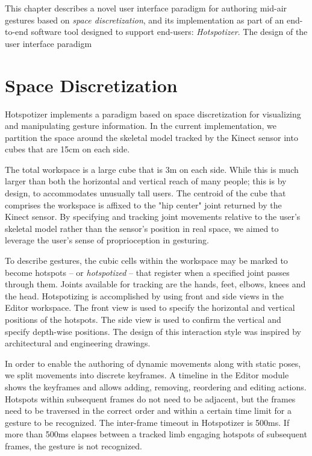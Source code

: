 This chapter describes a novel user interface paradigm for authoring mid-air gestures based on \emph{space discretization}, and its implementation as part of an end-to-end software tool designed to support end-users: \emph{Hotspotizer}. The design of the user interface paradigm

\section{Space Discretization}

Hotspotizer implements a paradigm based on space discretization for visualizing and manipulating gesture information. In the current implementation, we partition the space around the skeletal model tracked by the Kinect sensor into cubes that are 15cm on each side.

The total workspace is a large cube that is 3m on each side. While this is much larger than both the horizontal and vertical reach of many people; this is by design, to accommodates unusually tall users. The centroid of the cube that comprises the workspace is affixed to the "hip center" joint returned by the Kinect sensor. By specifying and tracking joint movements relative to the user’s skeletal model rather than the sensor’s position in real space, we aimed to leverage the user’s sense of proprioception \parencite{Shoemaker:2010} in gesturing.

To describe gestures, the cubic cells within the workspace may be marked to become hotspots – or \emph{hotspotized} – that register when a specified joint passes through them. Joints available for tracking are the hands, feet, elbows, knees and the head. Hotspotizing is accomplished by using front and side views in the Editor workspace. The front view is used to specify the horizontal and vertical positions of the hotspots. The side view is used to confirm the vertical and specify depth-wise positions. The design of this interaction style was inspired by architectural and engineering drawings.

In order to enable the authoring of dynamic movements along with static poses, we split movements into discrete keyframes. A timeline in the Editor module shows the keyframes and allows adding, removing, reordering and editing actions. Hotspots within subsequent frames do not need to be adjacent, but the frames need to be traversed in the correct order and within a certain time limit for a gesture to be recognized. The inter-frame timeout in Hotspotizer is 500ms. If more than 500ms elapses between a tracked limb engaging hotspots of subsequent frames, the gesture is not recognized.

